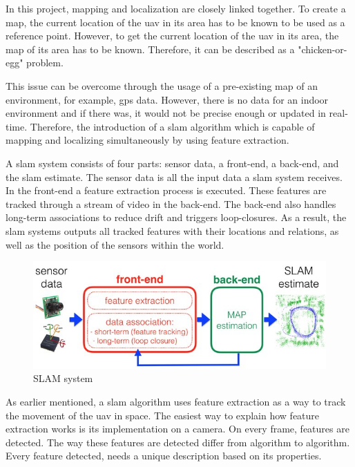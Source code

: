 In this project, mapping and localization are closely linked together. To create a map, the current location of the \acs{uav} in its area has to be known to be used as a reference point. However, to get the current location of the \acs{uav} in its area, the map of its area has to be known. Therefore, it can be described as a "chicken\hyp{}or\hyp{}egg" problem.

This issue can be overcome through the usage of a pre-existing map of an environment, for example, \acs{gps} data. However, there is no data for an indoor environment and if there was, it would not be precise enough or updated in real\hyp{}time. Therefore, the introduction of a \acs{slam} algorithm which is capable of mapping and localizing simultaneously by using feature extraction. \cite{slam_tech_and_tracking}

A \acs{slam} system consists of four parts: sensor data, a front\hyp{}end, a back\hyp{}end, and the \acs{slam} estimate. The sensor data is all the input data a \acs{slam} system receives. In the front\hyp{}end a feature extraction process is executed. These features are tracked through a stream of video in the back\hyp{}end. The back\hyp{}end also handles long\hyp{}term associations to reduce drift and triggers loop\hyp{}closures. As a result, the \acs{slam} systems outputs all tracked features with their locations and relations, as well as the position of the sensors within the world. \cite{andreas_jakl_slam}

\begin{figure}[!h]
  \centering
  \includegraphics[width=0.75\linewidth]{images/slam_system.jpg}
  \caption{SLAM system \cite{fe_be_slam_system}}
  \label{fig:slam_system}
\end{figure}

As earlier mentioned, a \acs{slam} algorithm uses feature extraction as a way to track the movement of the \acs{uav} in space. The easiest way to explain how feature extraction works is its implementation on a camera. On every frame, features are detected. The way these features are detected differ from algorithm to algorithm. Every feature detected, needs a unique description based on its properties. \cite{andreas_jakl_basics_of_ar}

